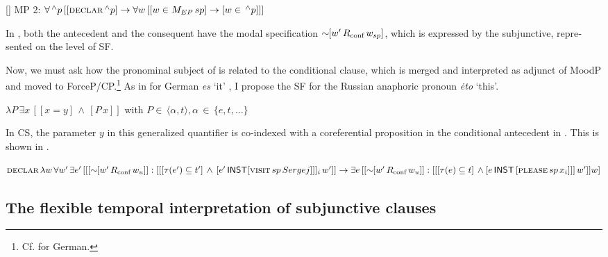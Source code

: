 \documentclass[output=paper,colorlinks,citecolor=brown]{langscibook}
\begin{document}
\begin{otherlanguage}{english}
\begin{exe}
[]{
MP 2: $\forall \,  ^{\wedge} p \, [[\textsc{declar} \, ^{\wedge}p] \to    \forall w \, [[w \in M_{EP} \, sp] \to [w \in \, ^{\wedge}p]]] $}
\end{exe}

\noindent In , both the antecedent and the consequent have the modal specification $\sim \negthinspace \negthinspace [w' \, R_\text{conf} \, w_{sp}]$, which is expressed by the subjunctive, represented on the level of SF.

Now, we must ask how the pronominal subject of  is related to the conditional clause, which is merged and interpreted as adjunct of MoodP and moved to ForceP/CP.\footnote{Cf. \textcite{Schwabe2016} for German.
} As in \textcite{Zimmermann2016} for German \textit{es} `it' , I propose the SF  for the Russian anaphoric pronoun \textit{{\.e}to} `this'.

\begin{exe}
\ex $\lambda P \, \exists x \, [[x = y] \, \wedge \, [P \, x]]$
\newline
with $P \in \, \langle \alpha,t \rangle, \alpha \, \in \, \{e,t, …\}  $\label{ex:16:37}
\end{exe}

\noindent In CS, the parameter $y$ in this generalized quantifier is co-indexed with a coreferential proposition in the conditional antecedent in . This is shown in .

\begin{exe}
\ex $\textsc{declar} \, \lambda w \, \forall w' \, \exists e' \, [[[\sim \negthinspace \negthinspace [w' \, R_\text{conf} \, w_{u}]] : [[[\tau (e') \subseteq t'] \, \wedge \, [e' \, \cnst{inst}
\newline
[\textsc{visit} \, sp \, Sergej]]]_{i} \, w']] \to \exists e \, [[\sim \negthinspace \negthinspace [w' \, R_\text{conf} \, w_{u}]] : [[[\tau (e) \subseteq t] \, \wedge
\newline
[e \, \cnst{inst} \, [\textsc{please} \, sp \, x_{i}]]] \, w']]w] $  \label{ex:16:38}
\end{exe}

\subsection{The flexible temporal interpretation of subjunctive clauses}


\end{otherlanguage}
\end{document}
